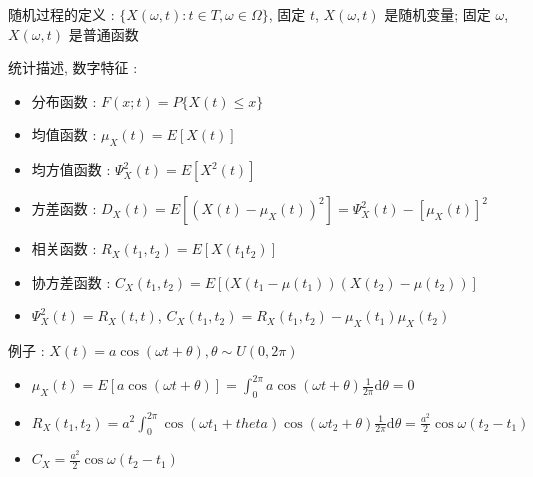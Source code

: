 \documentclass[UTF8, 12pt]{ctexart}
\begin{document}
	随机过程的定义 : $ \{X(\omega, t) : t \in T, \omega \in \Omega\} $, 固定 $ t $, $ X(\omega, t) $ 是随机变量; 固定 $ \omega $, $ X(\omega, t) $ 是普通函数

	统计描述, 数字特征 :
	\begin{itemize}[leftmargin = 4em]
		\item 分布函数 : $ F(x; t) = P\{X(t) \leq x\} $
		\item 均值函数 : $ \mu_{X}(t) = E[X(t)] $
		\item 均方值函数 : $ \Psi_{X}^{2}(t) = E[X^{2}(t)] $
		\item 方差函数 : $ D_{X}(t) = E[(X(t)-\mu_{X}(t))^{2}] = \Psi_{X}^{2}(t) - [\mu_{X}(t)]^{2} $
		\item 相关函数 : $ R_{X}(t_{1}, t_{2}) = E[X(t_{1}t_{2})] $
		\item 协方差函数 : $ C_{X}(t_{1}, t_{2}) = E[(X(t_{1}-\mu(t_{1}))(X(t_{2})-\mu(t_{2}))] $
		\item $ \Psi_{X}^{2}(t) = R_{X}(t, t) $, $ C_{X}(t_{1}, t_{2}) = R_{X}(t_{1}, t_{2})-\mu_{X}(t_{1})\mu_{X}(t_{2}) $
	\end{itemize}

	例子 : $ X(t) = a\cos(\omega t + \theta), \theta \sim U(0, 2\pi) $
	\begin{itemize}[leftmargin = 4em]
		\item $ \mu_{X}(t) = E[a\cos(\omega t + \theta)] = \int_{0}^{2\pi}a\cos(\omega t + \theta)\frac{1}{2\pi}\mathrm{d}\theta = 0 $
		\item $ R_{X}(t_{1}, t_{2}) = a^{2}\int_{0}^{2\pi}\cos(\omega t_{1} + theta)\cos(\omega t_{2} + \theta)\frac{1}{2\pi}\mathrm{d}\theta = \frac{a^{2}}{2}\cos\omega(t_{2}-t_{1}) $
		\item $ C_{X} = \frac{a^{2}}{2}\cos\omega(t_{2}-t_{1}) $
	\end{itemize}
\end{document}
